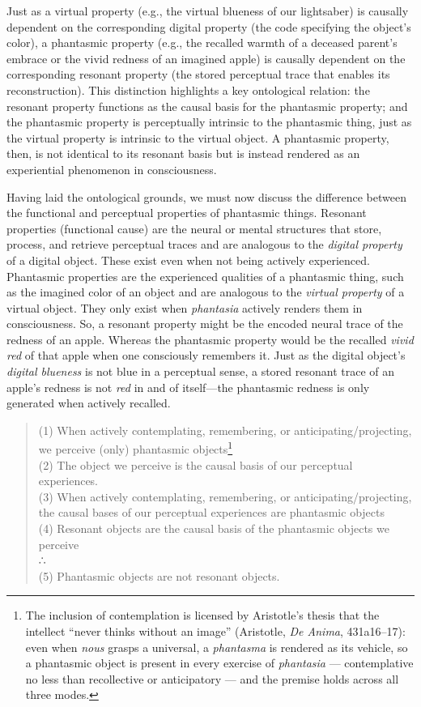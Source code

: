 \documentclass{article}
\begin{document}
Just as a virtual property (e.g., the virtual blueness of our lightsaber) is causally dependent on the corresponding digital property (the code specifying the object's color), a phantasmic property (e.g., the recalled warmth of a deceased parent's embrace or the vivid redness of an imagined apple) is causally dependent on the corresponding resonant property (the stored perceptual trace that enables its reconstruction). This distinction highlights a key ontological relation: the resonant property functions as the causal basis for the phantasmic property; and the phantasmic property is perceptually intrinsic to the phantasmic thing, just as the virtual property is intrinsic to the virtual object. A phantasmic property, then, is not identical to its resonant basis but is instead rendered as an experiential phenomenon in consciousness.

Having laid the ontological grounds, we must now discuss the difference between the functional and perceptual properties of phantasmic things. Resonant properties (functional cause) are the neural or mental structures that store, process, and retrieve perceptual traces and are analogous to the \textit{digital property} of a digital object. These exist even when not being actively experienced. Phantasmic properties are the experienced qualities of a phantasmic thing, such as the imagined color of an object and are analogous to the \textit{virtual property} of a virtual object. They only exist when \textit{phantasia} actively renders them in consciousness. So, a resonant property might be the encoded neural trace of the redness of an apple. Whereas the phantasmic property would be the recalled \textit{vivid red} of that apple when one consciously remembers it. Just as the digital object's \textit{digital blueness} is not blue in a perceptual sense, a stored resonant trace of an apple's redness is not \textit{red} in and of itself—the phantasmic redness is only generated when actively recalled.

\begin{quote}
(1) When actively contemplating, remembering, or anticipating/projecting, we perceive (only) phantasmic objects\footnote{The inclusion of contemplation is licensed by Aristotle's thesis that the intellect ``never thinks without an image'' (Aristotle, \textit{De Anima}, 431a16–17): even when \textit{nous} grasps a universal, a \textit{phantasma} is rendered as its vehicle, so a phantasmic object is present in every exercise of \textit{phantasia} — contemplative no less than recollective or anticipatory — and the premise holds across all three modes.} \\
(2) The object we perceive is the causal basis of our perceptual experiences. \\
(3) When actively contemplating, remembering, or anticipating/projecting, the causal bases of our perceptual experiences are phantasmic objects \\
(4) Resonant objects are the causal basis of the phantasmic objects we perceive \\
∴ \\
(5) Phantasmic objects are not resonant objects.
\end{quote}
\end{document}
